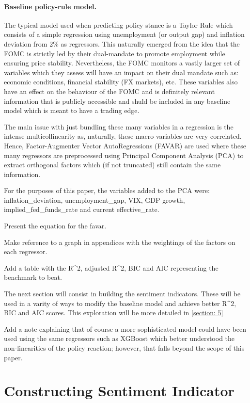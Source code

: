 \documentclass[11pt]{article}
\begin{document}
\paragraph{Baseline policy-rule model.} 
The typical model used when predicting policy stance is a Taylor Rule which consists of a simple regression using unemployment (or output gap) and inflation deviation from 2\% as regressors. This naturally emerged from the idea that the FOMC is strictly led by their dual-mandate to promote employment while ensuring price stability. Nevertheless, the FOMC monitors a vastly larger set of variables which they assess will have an impact on their dual mandate such as: economic conditions, financial stability (FX markets), etc. These variables also have an effect on the behaviour of the FOMC and is definitely relevant information that is publicly accessible and shuld be included in any baseline model which is meant to have a trading edge. 

The main issue with just bundling these many variables in a regression is the intense multicollinearity as, naturally, these macro variables are very correlated. Hence, Factor-Augmenter Vector AutoRegressions (FAVAR) are used where these many regressors are preprocessed using Principal Component Analysis (PCA) to extract orthogonal factors which (if not truncated) still contain the same information. 

For the purposes of this paper, the variables added to the PCA were: inflation_deviation, unemployment_gap, VIX, GDP growth, implied_fed_funds_rate and current effective_rate.

Present the equation for the favar.

Make reference to a graph in appendices with the weightings of the factors on each regressor.

Add a table with the R^2, adjusted R^2, BIC and AIC representing the benchmark to beat.

The next section will consist in building the sentiment indicators. These will be used in a varity of ways to modify the baseline model and achieve better R^2, BIC and AIC scores. This exploration will be more detailed in \ref{section: 5}

Add a note explaining that of course a more sophisticated model could have been used using the same regressors such as XGBoost which better understood the non-linearities of the policy reaction; however, that falls beyond the scope of this paper.


\section{Constructing Sentiment Indicator}
\end{document}
